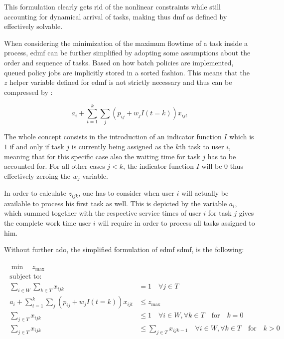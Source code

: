 This formulation clearly gets rid of the nonlinear constraints while still accounting for dynamical arrival of tasks, making thus \gls{dmf} as defined by \citet{Zeng2005} effectively solvable.

When considering the minimization of the maximum flowtime of a task inside a process, \gls{edmf} can be further simplified by adopting some assumptions about the order and sequence of tasks. Based on how batch policies are implemented, queued policy jobs are implicitly stored in a sorted fashion. This means that the $z$ helper variable defined for \gls{edmf} is not strictly necessary and thus can be compressed by :

\begin{equation}
\label{eq:simplified_z_with_k}
	a_i + \sum_{t=1}^k \sum_j (p_{ij} + w_j I(t=k))x_{ijt}
\end{equation}

The whole concept consists in the introduction of an indicator function $I$ which is $1$ if and only if task $j$ is currently being assigned as the $k$th task to user $i$, meaning that for this specific case also the waiting time for task $j$ has to be accounted for. For all other cases \ie $j<k$, the indicator function $I$ will be $0$ thus effectively zeroing the $w_j$ variable.

In order to calculate $z_{ijk}$, one has to consider when user $i$ will actually be available to process his first task as well. This is depicted by the variable $a_i$, which summed together with the respective service times of user $i$ for task $j$ gives the complete work time user $i$ will require in order to process all tasks assigned to him.

Without further ado, the simplified formulation of \gls{edmf} \ie \gls{sdmf}, is the following:

\begin{align}
	\begin{split}
	    \min \quad z_{\text{max}}\\
	    \text{subject to:} \\
	    \sum_{i \in W} \sum_{k \in T} x_{ijk} &= 1 \quad \forall j \in T\\
	    a_i + \sum_{t=1}^k \sum_j (p_{ij} + w_j I(t=k))x_{ijt} &\leq z_{\text{max}}\\
	    \sum_{j \in T} x_{ijk} &\leq 1 \quad \forall i \in W, \forall k \in T \quad \text{for} \quad k=0\\
	    \sum_{j \in T} x_{ijk} &\leq \sum_{j \in T} x_{ijk-1} \quad \forall i \in W, \forall k \in T \quad \text{for} \quad k>0
	\end{split}
\end{align}

